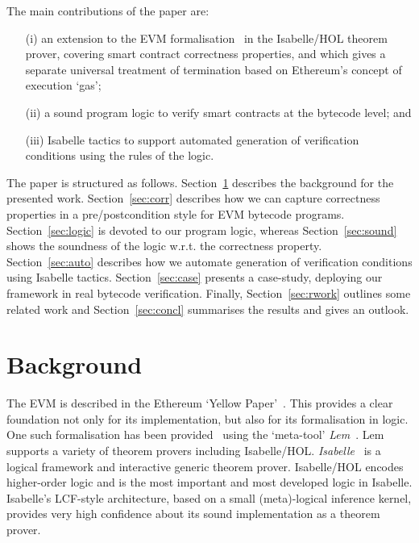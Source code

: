 \documentclass[sigplan,10pt,review]{acmart}\settopmatter{printfolios=true,printccs=false,printacmref=false}
\begin{document}
The main contributions of the paper are:
\begin{itemize}
\item[(i)] an extension to the EVM formalisation~\cite{Yoichi} in the Isabelle/HOL theorem prover,
           covering smart contract correctness properties, and which gives a separate universal
           treatment of termination based on Ethereum's concept of execution `gas';
\item[(ii)] a sound program logic to verify smart contracts at the bytecode level; and
\item[(iii)] Isabelle tactics to support automated generation of verification
            conditions using the rules of the logic.
\end{itemize}
         
The paper is structured as follows. Section~\ref{sec:bg} describes the background
for the presented work. Section~\ref{sec:corr} describes how we can capture correctness properties in a pre/postcondition
style for EVM bytecode programs. Section~\ref{sec:logic} is devoted to our program logic, 
whereas Section~\ref{sec:sound} shows the soundness of the logic
w.r.t. the correctness property. Section~\ref{sec:auto} describes how we automate generation of verification
conditions using Isabelle tactics. Section~\ref{sec:case} presents a case-study, deploying our framework in 
real bytecode verification. Finally, Section~\ref{sec:rwork} outlines some related work and
Section~\ref{sec:concl} summarises the results and gives an outlook.
%
\section{Background} 
\label{sec:bg}
The EVM is described in the Ethereum `Yellow Paper'~\cite{wood2014ethereum}.
This provides a clear foundation not only for its implementation, but also for its formalisation in logic.
One such formalisation has been provided~\cite{Yoichi} using the `meta-tool' \emph{Lem}~\cite{DBLP:conf/icfp/MulliganOGRS14}.
Lem supports a variety of theorem provers including Isabelle/HOL.
\emph{Isabelle}~\cite{Nipkow_PW:Isabelle} is a logical framework and interactive generic theorem prover.
Isabelle/HOL encodes higher-order logic and is the most important and most developed logic in Isabelle.
Isabelle's LCF-style architecture,
based on a small (meta)-logical inference kernel, provides very high confidence about its sound
implementation as a theorem prover.
 
\end{document}
